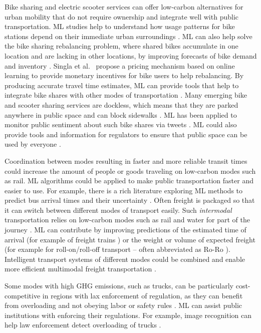 \documentclass[11pt]{report}
\newcommand{\et}{et al.~}
\begin{document}
Bike sharing and electric scooter services can offer low-carbon alternatives for urban mobility that do not require ownership and integrate well with public transportation. ML studies help to understand how usage patterns for bike stations depend on their immediate urban surroundings \cite{HYLAND201871}.
ML can also help solve the bike sharing rebalancing problem, where shared bikes accumulate in one location and are lacking in other locations, by improving forecasts of bike demand and inventory \cite{REGUE2014192}. Singla \et  \cite{Singla:2015:IUB:2887007.2887108} propose a pricing mechanism based on online learning to provide monetary incentives for bike users to help rebalancing. By producing accurate travel time estimates, ML can provide tools that help to integrate bike shares with other modes of transportation \cite{8005582}.
Many emerging bike and scooter sharing services are dockless, which means that they are parked anywhere in public space and can block sidewalks \cite{anderson2019governing}. ML has been applied to monitor public sentiment about such bike shares via tweets \cite{doi:10.1177/0361198119838982}. ML could also provide tools and information for regulators to ensure that public space can be used by everyone \cite{citylab2019race}. 

Coordination between modes resulting in faster and more reliable transit times could increase the amount of people or goods traveling on low-carbon modes such as rail. 
ML algorithms could be applied to make public transportation faster and easier to use. For example, there is a rich literature exploring ML methods to predict bus arrival times and their uncertainty \cite{altinkaya2013bus, MAZLOUMI2011534}.
Often freight is packaged so that it can switch between different modes of transport easily. Such \emph{intermodal} transportation relies on low-carbon modes such as rail and water for part of the journey \cite{kaack2018decarbonizing}.
ML can contribute by improving predictions of the estimated time of arrival (for example of freight trains \cite{BARBOUR2018211}) or the weight or volume of expected freight (for example for roll-on/roll-off transport -- often abbreviated as Ro-Ro \cite{doi:10.1111/itor.12337}). Intelligent transport systems of different modes could be combined and enable more efficient multimodal freight transportation \cite{kaack2018decarbonizing}.


Some modes with high GHG emissions, such as trucks, can be particularly cost-competitive in regions with lax enforcement of regulation, as they can benefit from overloading and not obeying labor or safety rules \cite{kaack2018decarbonizing}. 
ML can assist public institutions with enforcing their regulations. For example, image recognition can help law enforcement detect overloading of trucks \cite{2018AIPC.1955d0038Z}.
\end{document}
